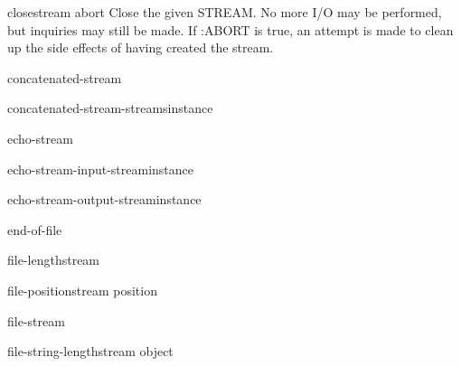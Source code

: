 \begin{function}{close}{stream \key abort}{}
  Close the given STREAM. No more I/O may be performed, but
  inquiries may still be made. If :ABORT is true, an attempt is made
  to clean up the side effects of having created the stream.
\end{function}

\begin{class}{concatenated-stream}{}{}
  
\end{class}

\begin{function}{concatenated-stream-streams}{instance}{}
  
\end{function}

\begin{class}{echo-stream}{}{}
  
\end{class}

\begin{function}{echo-stream-input-stream}{instance}{}
  
\end{function}

\begin{function}{echo-stream-output-stream}{instance}{}
  
\end{function}

\begin{condition-type}{end-of-file}{}{}
  
\end{condition-type}

\begin{function}{file-length}{stream}{}
  
\end{function}

\begin{function}{file-position}{stream \op position}{}
  
\end{function}

\begin{class}{file-stream}{}{}
  
\end{class}

\begin{function}{file-string-length}{stream object}{}
  
\end{function}

